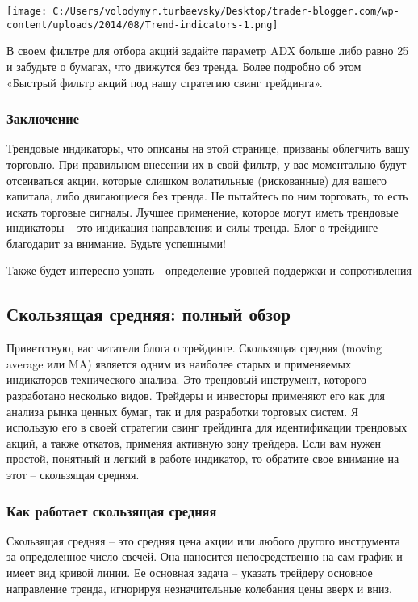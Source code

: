 \documentclass[a5paper]{article}
\begin{document}
\texttt{[image: C:/Users/volodymyr.turbaevsky/Desktop/trader-blogger.com/wp-content/uploads/2014/08/Trend-indicators-1.png]}

В своем фильтре для отбора акций задайте параметр ADX больше либо равно 25 и забудьте
о бумагах, что движутся без тренда. Более подробно об этом «Быстрый
фильтр акций под нашу стратегию свинг трейдинга».

\subsubsection{Заключение}

Трендовые индикаторы, что описаны на этой странице, призваны облегчить вашу торговлю. При правильном внесении их в свой фильтр, у вас моментально будут отсеиваться акции, которые слишком волатильные (рискованные) для вашего капитала, либо двигающиеся без тренда. Не пытайтесь по ним торговать, то есть искать торговые сигналы. Лучшее применение, которое могут иметь трендовые индикаторы – это индикация направления и силы тренда. Блог о трейдинге благодарит за внимание. Будьте успешными!


Также будет интересно узнать - определение уровней поддержки и сопротивления


\subsection{Скользящая средняя: полный обзор}

Приветствую, вас читатели блога о трейдинге. Скользящая средняя (moving average или MA) является одним из наиболее старых и применяемых индикаторов технического анализа. Это трендовый инструмент, которого разработано несколько видов. Трейдеры и инвесторы применяют его как для анализа рынка ценных бумаг, так и для разработки торговых систем. Я использую его в своей стратегии свинг трейдинга для идентификации трендовых акций, а также откатов, применяя активную зону трейдера. Если вам нужен простой, понятный и легкий в работе индикатор, то обратите свое внимание на этот – скользящая средняя.

\subsubsection{Как работает скользящая средняя}

Скользящая средняя – это средняя цена акции или любого другого инструмента за определенное число свечей. Она наносится непосредственно на сам график и имеет вид кривой линии. Ее основная задача – указать трейдеру основное направление тренда, игнорируя незначительные колебания цены вверх и вниз.
\end{document}
